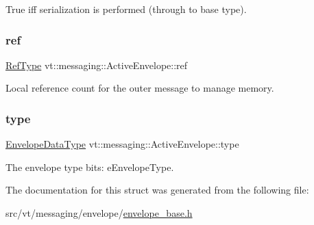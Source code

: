 True iff serialization is performed (through to base type). 

\mbox{\label{structvt_1_1messaging_1_1_active_envelope_a61861e4316e9c65f7a18ba792da412e2}} 
\subsubsection{\texorpdfstring{ref}{ref}}
{\footnotesize\ttfamily \hyperlink{namespacevt_a9b39ce9494bb04674d0d5b895a5aa50f}{Ref\+Type} vt\+::messaging\+::\+Active\+Envelope\+::ref}



Local reference count for the outer message to manage memory. 

\mbox{\label{structvt_1_1messaging_1_1_active_envelope_aaa2cebe2e468e71249feff85841521d4}} 
\subsubsection{\texorpdfstring{type}{type}}
{\footnotesize\ttfamily \hyperlink{namespacevt_a2740126d59f361d9ba46f66b3b4b0d3d}{Envelope\+Data\+Type} vt\+::messaging\+::\+Active\+Envelope\+::type}



The envelope type bits\+: {\ttfamily e\+Envelope\+Type}. 



The documentation for this struct was generated from the following file\+:\begin{DoxyCompactItemize}
\item 
src/vt/messaging/envelope/\hyperlink{envelope__base_8h}{envelope\+\_\+base.\+h}\end{DoxyCompactItemize}

